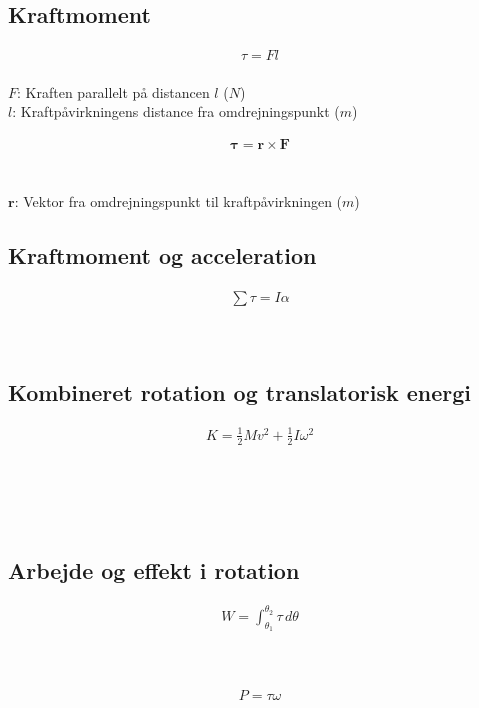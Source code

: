 \subsection{Kraftmoment}
	\begin{align}
		\tau=Fl
	\end{align}
	\kraftmom\\
	$F$: Kraften parallelt på distancen $l$ ($N$)\\
	$l$: Kraftpåvirkningens distance fra omdrejningspunkt ($m$)

	\begin{align}
		\boldsymbol{\tau}=\mathbf{r}\times\mathbf{F}
	\end{align}
	\Kraftmom\\
	\Kraft\\
	$\mathbf{r}$: Vektor fra omdrejningspunkt til kraftpåvirkningen ($m$)

\subsection{Kraftmoment og acceleration}
	\begin{align}
		\sum\tau=I\alpha
	\end{align}
	\Kraftmom\\
	\inertimom\\
	\vinkelacceleration

\subsection{Kombineret rotation og translatorisk energi}
	\begin{align}
		K=\frac{1}{2}Mv^2+\frac{1}{2}I\omega^2
	\end{align}
	\kinenergi\\
	\masse\\
	\vel\\
	\inertimom\\
	\vinkelhast

\subsection{Arbejde og effekt i rotation}
	\begin{align}
		W=\int_{\theta_1}^{\theta_2}\tau\,d\theta
	\end{align}
	\arbejde\\
	\vinkel\\
	\kraftmom

	\begin{align}
		P=\tau\omega
	\end{align}
	\effekt\\
	\kraftmom\\
	\vinkelhast

